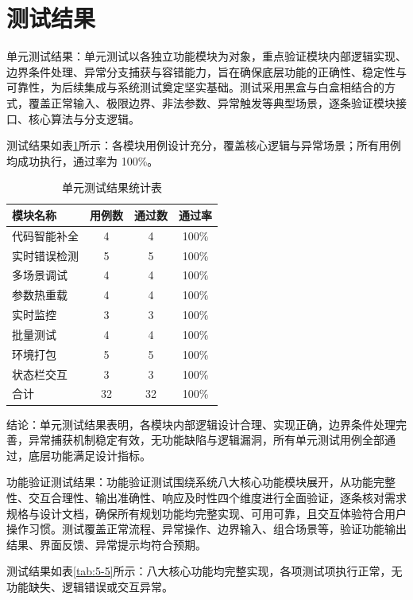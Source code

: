 \section{测试结果}

单元测试结果：单元测试以各独立功能模块为对象，重点验证模块内部逻辑实现、边界条件处理、异常分支捕获与容错能力，旨在确保底层功能的正确性、稳定性与可靠性，为后续集成与系统测试奠定坚实基础。测试采用黑盒与白盒相结合的方式，覆盖正常输入、极限边界、非法参数、异常触发等典型场景，逐条验证模块接口、核心算法与分支逻辑。

测试结果如表\ref{tab:5-4}所示：各模块用例设计充分，覆盖核心逻辑与异常场景；所有用例均成功执行，通过率为
100\%。

\begin{table}[H]
\centering
\caption{单元测试结果统计表}
\label{tab:5-4}
\footnotesize
\renewcommand{\arraystretch}{1.18}
\begin{tabularx}{\textwidth}{Xccc}
\toprule
模块名称 & 用例数 & 通过数 & 通过率 \\
\midrule
代码智能补全 & 4 & 4 & 100\% \\
实时错误检测 & 5 & 5 & 100\% \\
多场景调试 & 4 & 4 & 100\% \\
参数热重载 & 4 & 4 & 100\% \\
实时监控 & 3 & 3 & 100\% \\
批量测试 & 4 & 4 & 100\% \\
环境打包 & 5 & 5 & 100\% \\
状态栏交互 & 3 & 3 & 100\% \\
合计 & 32 & 32 & 100\% \\
\bottomrule
\end{tabularx}
\end{table}



结论：单元测试结果表明，各模块内部逻辑设计合理、实现正确，边界条件处理完善，异常捕获机制稳定有效，无功能缺陷与逻辑漏洞，所有单元测试用例全部通过，底层功能满足设计指标。

功能验证测试结果：功能验证测试围绕系统八大核心功能模块展开，从功能完整性、交互合理性、输出准确性、响应及时性四个维度进行全面验证，逐条核对需求规格与设计文档，确保所有规划功能均完整实现、可用可靠，且交互体验符合用户操作习惯。测试覆盖正常流程、异常操作、边界输入、组合场景等，验证功能输出结果、界面反馈、异常提示均符合预期。

测试结果如表\ref{tab:5-5}所示：八大核心功能均完整实现，各项测试项执行正常，无功能缺失、逻辑错误或交互异常。

